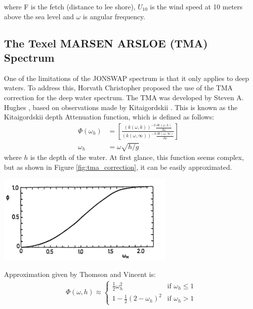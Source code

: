 where F is the fetch (distance to lee shore), $U_{10}$ is the wind speed at 10 meters above the sea level and $\omega$ is angular frequency.

\subsection{The Texel MARSEN ARSLOE (TMA) Spectrum}
One of the limitations of the JONSWAP spectrum is that it only applies to deep waters. To address this, Horvath Christopher \cite{horvath2015} proposed the use of the TMA correction for the deep water spectrum. The TMA was developed by Steven A. Hughes \cite{hughes1984}, based on observations made by Kitaigordskii \cite{kitaigordskii1975}. This is known as the Kitaigordskii depth Attenuation function, which is defined as follows:
\begin{equation}
    \begin{aligned}
        \Phi(\omega_h) &= \left[ \frac{(k(\omega, k))^{-3}\frac{\partial k(\omega, h)}{\partial \omega}}{(k(\omega, \infty ))^{-3}\frac{\partial k(\omega, \infty)}{\partial \omega}} \right] \\
        \omega_h &= \omega \sqrt{h/g}
    \end{aligned}
\end{equation}
where $h$ is the depth of the water. At first glance, this function seems complex, but as shown in Figure \ref{fig:tma_correction}, it can be easily approximated.

\begin{minipage}{1\textwidth}
    \centering
    \includegraphics[width=0.65\textwidth]{"images/tma_correction.png"}
    \label{fig:tma_correction}
\end{minipage}

Approximation given by Thomson and Vincent \cite{thompson1983} is:
\begin{equation}
    \begin{aligned}
        &\Phi(\omega, h) \approx
        \begin{cases} 
        \frac{1}{2} \omega_h^{2} & \text{if } \omega_h \leq 1 \\
        1 - \frac{1}{2}(2 - \omega_h)^{2} & \text{if } \omega_h > 1
        \end{cases}
    \end{aligned}
\end{equation}

